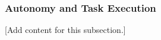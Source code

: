
\subsubsection{Autonomy and Task Execution}
\label{subsubsec:design_5_5_autonomy_task_execution}

[Add content for this subsection.]
